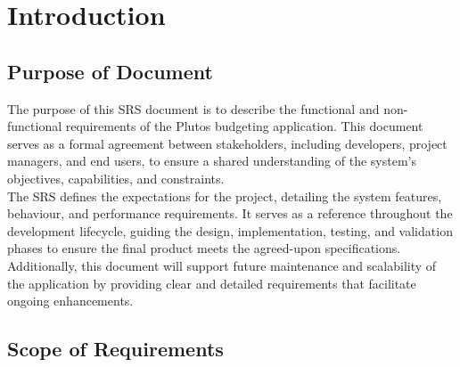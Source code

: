 \documentclass[12pt]{article}
\begin{document}


\section{Introduction}


\subsection{Purpose of Document}

The purpose of this SRS document is to describe the functional and non-functional requirements of the Plutos budgeting application. This document serves as a formal agreement between stakeholders, including developers, project managers, and end users, to ensure a shared understanding of the system's objectives, capabilities, and constraints. \\

\noindent The SRS defines the expectations for the project, detailing the system features, behaviour, and performance requirements. It serves as a reference throughout the development lifecycle, guiding the design, implementation, testing, and validation phases to ensure the final product meets the agreed-upon specifications. Additionally, this document will support future maintenance and scalability of the application by providing clear and detailed requirements that facilitate ongoing enhancements.

\subsection{Scope of Requirements} 
\end{document}
